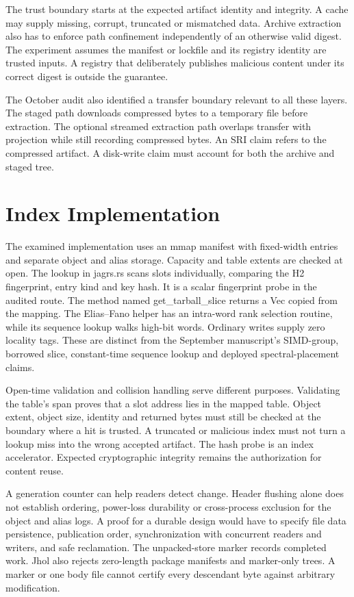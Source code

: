 \documentclass[
  11pt,
  letterpaper,
]{article}
\begin{document}
The trust boundary starts at the expected artifact identity and
integrity. A cache may supply missing, corrupt, truncated or mismatched
data. Archive extraction also has to enforce path confinement
independently of an otherwise valid digest. The experiment assumes the
manifest or lockfile and its registry identity are trusted inputs. A
registry that deliberately publishes malicious content under its correct
digest is outside the guarantee.

The October audit also identified a transfer boundary relevant to all
these layers. The staged path downloads compressed bytes to a temporary
file before extraction. The optional streamed extraction path overlaps
transfer with projection while still recording compressed bytes. An SRI
claim refers to the compressed artifact. A disk-write claim must account
for both the archive and staged tree.

\section{Index Implementation}\label{index-implementation}

The examined implementation uses an mmap manifest with fixed-width
entries and separate object and alias storage. Capacity and table
extents are checked at open. The lookup in jagrs.rs scans slots
individually, comparing the H2 fingerprint, entry kind and key hash. It
is a scalar fingerprint probe in the audited route. The method named
get\_tarball\_slice returns a Vec copied from the mapping. The
Elias--Fano helper has an intra-word rank selection routine, while its
sequence lookup walks high-bit words. Ordinary writes supply zero
locality tags. These are distinct from the September manuscript's
SIMD-group, borrowed slice, constant-time sequence lookup and deployed
spectral-placement claims.

Open-time validation and collision handling serve different purposes.
Validating the table's span proves that a slot address lies in the
mapped table. Object extent, object size, identity and returned bytes
must still be checked at the boundary where a hit is trusted. A
truncated or malicious index must not turn a lookup miss into the wrong
accepted artifact. The hash probe is an index accelerator. Expected
cryptographic integrity remains the authorization for content reuse.

A generation counter can help readers detect change. Header flushing
alone does not establish ordering, power-loss durability or
cross-process exclusion for the object and alias logs. A proof for a
durable design would have to specify file data persistence, publication
order, synchronization with concurrent readers and writers, and safe
reclamation. The unpacked-store marker records completed work. Jhol also
rejects zero-length package manifests and marker-only trees. A marker or
one body file cannot certify every descendant byte against arbitrary
modification.
\end{document}
